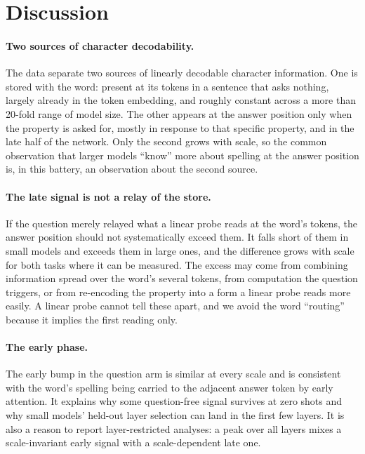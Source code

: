 \section{Discussion}
\label{sec:discussion}

\paragraph{Two sources of character decodability.}
The data separate two sources of linearly decodable character information. One is stored with the
word: present at its tokens in a sentence that asks nothing, largely already in the token embedding,
and roughly constant across a more than 20-fold range of model size. The other appears at the answer position
only when the property is asked for, mostly in response to that specific property, and in the late
half of the network. Only the second grows with scale, so the common observation that larger models
``know'' more about spelling at the answer position is, in this battery, an observation about the
second source.

\paragraph{The late signal is not a relay of the store.}
If the question merely relayed what a linear probe reads at the word's tokens, the answer position
should not systematically exceed them. It falls short of them in small models and exceeds them in
large ones, and the difference grows with scale for both tasks where it can be measured. The excess may
come from combining information spread over the word's several tokens, from computation the
question triggers, or from re-encoding the property into a form a linear probe reads more easily. A
linear probe cannot tell these apart, and we avoid the word ``routing'' because it implies the first
reading only.

\paragraph{The early phase.}
The early bump in the question arm is similar at every scale and is consistent with the word's
spelling being carried to the adjacent answer token by early attention. It explains why some
question-free signal survives at zero shots and why small models' held-out layer selection can land
in the first few layers. It is also a reason to report layer-restricted analyses: a peak over all
layers mixes a scale-invariant early signal with a scale-dependent late one.

